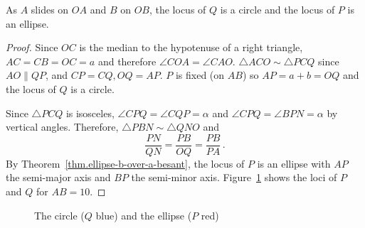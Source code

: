 
\newpage

\begin{theorem}
As $A$ slides on $OA$ and $B$ on $OB$, the locus of $Q$ is a circle and the locus of $P$ is an ellipse.
\end{theorem}
\begin{proof}
Since $OC$ is the median to the hypotenuse of a right triangle, $AC=CB=OC=a$  and therefore $\angle COA=\angle CAO$. $\triangle ACO\sim \triangle PCQ$ since $AO\parallel QP$, and $CP=CQ, OQ=AP$. $P$ is fixed (on $AB$) so $AP=a+b=OQ$ and the locus of $Q$ is a circle.

Since $\triangle PCQ$ is isosceles, $\angle CPQ=\angle CQP=\alpha$ and $\angle CPQ=\angle BPN=\alpha$ by vertical angles. Therefore, $\triangle PBN\sim \triangle QNO$ and
\[
\frac{PN}{QN}=\frac{PB}{OQ}=\frac{PB}{PA}\,.
\]
By Theorem~\ref{thm.ellipse-b-over-a-besant}, the locus of $P$ is an ellipse with $AP$ the semi-major axis and $BP$ the semi-minor axis. Figure~\ref{f.glissette2} shows the loci of $P$ and $Q$ for $AB=10$.\hqed
\end{proof}


\begin{figure}[t]
\begin{center}
\caption{The circle ($Q$ blue) and the ellipse ($P$ red)}\label{f.glissette2}
\end{center}
\end{figure}

